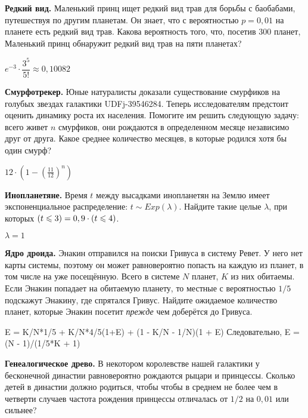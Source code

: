\documentclass[12pt, addpoints]{exam} %
\let\P\relax
\DeclareMathOperator{\P}{\mathbb{P}}
\renewcommand{\leq}{\leqslant}
\begin{document}
\begin{questions}

\question \textbf{Редкий вид.} Маленький принц ищет редкий вид трав для борьбы с баобабами, путешествуя по другим планетам. Он знает, что с вероятностью $p=0,01$ на планете есть редкий вид трав. Какова вероятность того, что, посетив $300$ планет, Маленький принц обнаружит редкий вид трав на пяти планетах?

\begin{solution}
$e^{-3}\cdot\dfrac{3^5}{5!} \approx 0,10082$
\end{solution}


\question  \textbf{Смурфотрекер.} Юные натуралисты доказали существование смурфиков на голубых звездах галактики UDFj-39546284. Теперь исследователям предстоит оценить динамику роста их населения. Помогите им решить следующую задачу: всего живет $n$ смурфиков, они  рождаются в определенном месяце независимо друг от друга. Какое среднее количество месяцев, в которые родился хотя бы один смурф?

\begin{solution}
$12 \cdot (1-{(\frac{11}{12})}^n)$
\end{solution}

\question \textbf{Инопланетяне.} Время $t$ между высадками инопланетян на Землю имеет экспоненциальное распределение: $t \sim Exp(\lambda)$. Найдите такие целые $\lambda$, при которых $\P(t\leq 3) = 0,9 \cdot \P(t\leq 4)$.
\begin{solution}
$\lambda = 1$
\end{solution}

\question \textbf{Ядро дроида.} Энакин отправился на поиски Гривуса в систему Ревет. У него нет карты системы, поэтому он может равновероятно попасть на каждую из планет, в том числе на уже посещённую. Всего в системе $N$ планет, $K$ из них обитаемы. Если Энакин попадает на обитаемую планету, то местные с вероятностью $1/5$ подскажут Энакину, где спрятался Гривус. Найдите ожидаемое количество планет, которые Энакин посетит \textit{прежде} чем доберётся до Гривуса.
\begin{solution}
E = K/N*1/5 + K/N*4/5(1+E) + (1 - K/N - 1/N)(1 + E) Следовательно, E = (N - 1)/(1/5*K + 1)
\end{solution}


\question \textbf{Генеалогическое древо.} В некотором королевстве нашей галактики у бесконечной династии равновероятно рождаются рыцари и принцессы. Сколько детей в династии должно родиться, чтобы чтобы в среднем не более чем в четверти случаев частота рождения принцессы отличалась от $1/2$ на $0,01$ или сильнее?


\end{questions}
\end{document}
